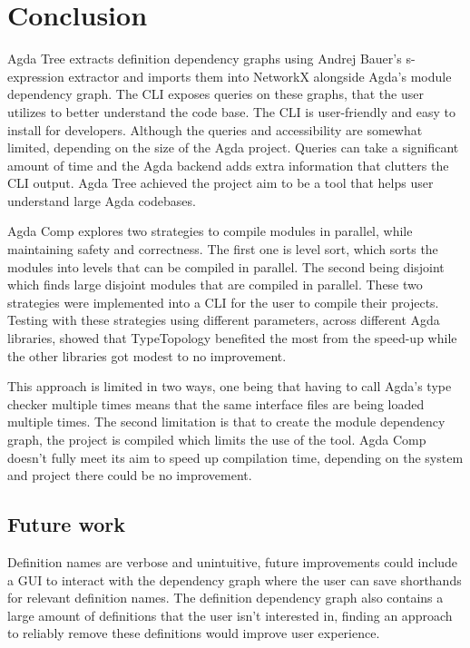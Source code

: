 
\chapter{Conclusion}


Agda Tree extracts definition dependency graphs using Andrej Bauer's
s-expression extractor \cite{andrej} and imports them into NetworkX alongside
Agda's module dependency graph. The CLI exposes queries on these graphs, that
the user utilizes to better understand the code base. The CLI is user-friendly
and easy to install for developers. Although the queries and accessibility are
somewhat limited, depending on the size of the Agda project. Queries can take a
significant amount of time and the Agda backend adds extra information that
clutters the CLI output. Agda Tree achieved the project aim to be a tool that
helps user understand large Agda codebases.

Agda Comp explores two strategies to compile modules in parallel, while
maintaining safety and correctness. The first one is level sort, which sorts
the modules into levels that can be compiled in parallel. The second being
disjoint which finds large disjoint modules that are compiled in parallel.
These two strategies were implemented into a CLI for the user to compile their
projects. Testing with these strategies using different parameters, across
different Agda libraries, showed that TypeTopology benefited the most from the
speed-up while the other libraries got modest to no improvement.

This approach is limited in two ways, one being that having to call Agda's type
checker multiple times means that the same interface files are being loaded
multiple times. The second limitation is that to create the module dependency
graph, the project is compiled which limits the use of the tool. Agda Comp
doesn't fully meet its aim to speed up compilation time, depending on the
system and project there could be no improvement.

\section{Future work}

Definition names are verbose and unintuitive, future improvements could include
a GUI to interact with the dependency graph where the user can save shorthands
for relevant definition names. The definition dependency graph also contains a
large amount of definitions that the user isn't interested in, finding an
approach to reliably remove these definitions would improve user experience.

